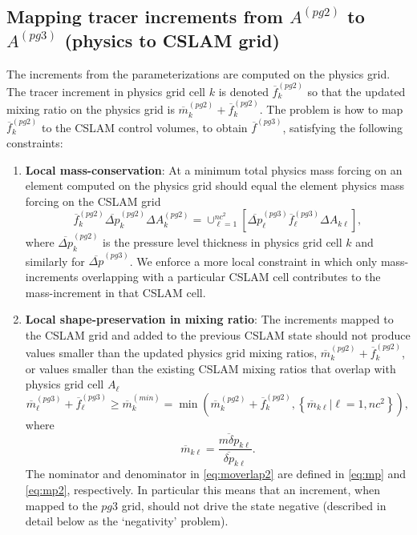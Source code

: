 \subsection{Mapping tracer increments from $A^{(pg2)}$ to $A^{(pg3)}$ (physics to CSLAM grid)}\label{sec:pgtonc}
The increments from the parameterizations are computed on the physics grid. The tracer increment in physics grid cell $k$ is denoted $\overline{f}_k^{(pg2)}$ so that the updated mixing ratio on the physics grid is ${\overline{m}}^{(pg2)}_k+\overline{f}_k^{(pg2)}$. The problem is how to map $\overline{f}_k^{(pg2)}$ to the CSLAM control volumes, to obtain ${\overline{f}}^{(pg3)}$, satisfying the following constraints:
\begin{enumerate}
\item {\bf{Local mass-conservation}}: At a minimum total physics mass forcing on an element computed on the physics grid should equal the element physics mass forcing on the CSLAM grid
\begin{equation}
{\overline{f}}_k^{(pg2)}{\overline{\Delta p}}^{(pg2)}_k\Delta A_k^{(pg2)}=\cup_{\ell=1}^{nc^2}\left[{\overline{\Delta p}}^{(pg3)}_\ell {\overline{f}}^{(pg3)}_\ell\Delta A_{k\ell}\right],
\end{equation}
where $\overline{\Delta p}^{(pg2)}_k$ is the pressure level thickness in physics grid cell $k$ and similarly for $\overline{\Delta p}^{(pg3)}$. We enforce a more local constraint in which only mass-increments overlapping with a particular CSLAM cell contributes to the mass-increment in that CSLAM cell.
\item {\bf{Local shape-preservation in mixing ratio}}: The increments mapped to the CSLAM grid and added to the previous CSLAM state should not produce values smaller than the updated physics grid mixing ratios, ${\overline{m}}^{(pg2)}_k+\overline{f}_k^{(pg2)}$, or values smaller than the existing CSLAM mixing ratios that overlap with physics grid cell $A_\ell$
\begin{equation}
\label{eq:min}
\overline{m}^{(pg3)}_\ell+{\overline{f}}^{(pg3)}_\ell \ge \overline{m}^{(min)}_k=\min \left( {\overline{m}}^{(pg2)}_k+{\overline{f}}_k^{(pg2)},\left\{ {\overline{m}}_{k\ell} |\ell=1,nc^2\right\} \right),
\end{equation}
where
\begin{equation}
\label{eq:moverlap2}
\overline{m}_{k\ell}=\frac{\overline{m\delta p}_{k\ell}}{\overline{\delta p}_{k\ell}}.
\end{equation}
The nominator and denominator in \eqref{eq:moverlap2} are defined in \eqref{eq:mp} and \eqref{eq:mp2}, respectively. In particular this means that an increment, when mapped to the $pg3$ grid, should not drive the state negative (described in detail below as the `negativity' problem).


\end{enumerate}
